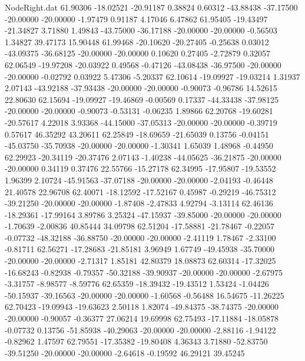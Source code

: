 \begin{filecontents}{NodeRight.dat}
  61.90306  -18.02521  -20.91187     0.38824    0.60312  -43.88438  -37.17500  -20.00000  -20.00000   -1.97479    0.91187    4.17046    6.47862
  61.95405  -19.43497  -21.34827     3.71880    1.49843  -43.75000  -36.17188  -20.00000  -20.00000   -0.56503    1.34827   39.47173   15.90448
  61.99468  -20.10620  -20.27405    -0.25638    0.03012  -43.09375  -36.68125  -20.00000  -20.00000    0.10620    0.27405   -2.72879    0.32057
  62.06549  -19.97208  -20.03922     0.49568   -0.47126  -43.08438  -36.97500  -20.00000  -20.00000   -0.02792    0.03922    5.47306   -5.20337
  62.10614  -19.09927  -19.03214     1.31937    2.07143  -43.92188  -37.93438  -20.00000  -20.00000   -0.90073   -0.96786   14.52615   22.80630
  62.15694  -19.09927  -19.46869    -0.00569    0.17337  -44.33438  -37.98125  -20.00000  -20.00000   -0.90073   -0.53131   -0.06235    1.89866
  62.20768  -19.60281  -20.57617     4.22018    3.93368  -44.15000  -37.05313  -20.00000  -20.00000   -0.39719    0.57617   46.35292   43.20611
  62.25849  -18.69659  -21.65039     0.13756   -0.04151  -45.03750  -35.70938  -20.00000  -20.00000   -1.30341    1.65039    1.48968   -0.44950
  62.29923  -20.34119  -20.37476     2.07143   -1.40238  -44.05625  -36.21875  -20.00000  -20.00000    0.34119    0.37476   22.55766  -15.27178
  62.34995  -17.95807  -19.53552     1.96399    2.10724  -45.91563  -37.07188  -20.00000  -20.00000   -2.04193   -0.46448   21.40578   22.96708
  62.40071  -18.12592  -17.52167     0.45987   -0.29219  -46.75312  -39.21250  -20.00000  -20.00000   -1.87408   -2.47833    4.92794   -3.13114
  62.46136  -18.29361  -17.99164     3.89786    3.25324  -47.15937  -39.85000  -20.00000  -20.00000   -1.70639   -2.00836   40.85444   34.09798
  62.51204  -17.58881  -21.78467    -0.22057   -0.07732  -48.32188  -36.88750  -20.00000  -20.00000   -2.41119    1.78467   -2.33100   -0.81711
  62.56271  -17.28683  -21.85181     3.96949    1.67749  -49.45938  -35.70000  -20.00000  -20.00000   -2.71317    1.85181   42.80379   18.08873
  62.60314  -17.32025  -16.68243    -0.82938   -0.79357  -50.32188  -39.90937  -20.00000  -20.00000   -2.67975   -3.31757   -8.98577   -8.59776
  62.65359  -18.39432  -19.43512     1.53424   -1.04426  -50.15937  -39.16563  -20.00000  -20.00000   -1.60568   -0.56488   16.54675  -11.26225
  62.70423  -19.09943  -19.63623     2.50118    1.82074  -49.84375  -38.74375  -20.00000  -20.00000   -0.90057   -0.36377   27.06214   19.69998
  62.75493  -17.11884  -18.05878    -0.07732    0.13756  -51.85938  -40.29063  -20.00000  -20.00000   -2.88116   -1.94122   -0.82962    1.47597
  62.79551  -17.35382  -19.80408     4.36343    3.71880  -52.83750  -39.51250  -20.00000  -20.00000   -2.64618   -0.19592   46.29121   39.45245

\end{filecontents}

